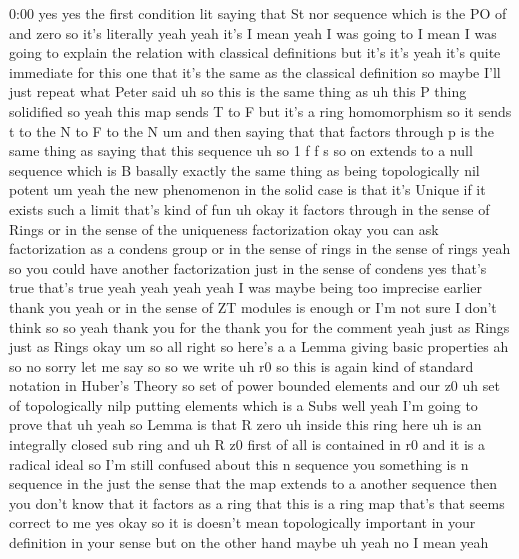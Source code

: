 \begin{unfinished}{0:00}
yes  yes  the  first  condition  lit  saying
that  St  nor  sequence  which  is  the  PO  of
and  zero  so  it's  literally  yeah  yeah
it's  I  mean  yeah  I  was  going  to  I  mean  I
was  going  to  explain  the  relation  with
classical  definitions  but  it's  it's  yeah
it's  quite  immediate  for  this  one  that
it's  the  same  as  the  classical
definition  so  maybe  I'll  just  repeat
what  Peter  said  uh  so  this  is  the  same
thing  as  uh  this  P  thing
solidified  so  yeah  this  map  sends  T  to  F
but  it's  a  ring  homomorphism  so  it  sends
t  to  the  N  to  F  to  the  N  um  and  then
saying  that  that  factors  through  p  is
the  same  thing  as  saying  that  this
sequence  uh  so  1  f  f  s  so  on  extends  to
a  null  sequence  which  is  B  basally
exactly  the  same  thing  as  being
topologically  nil
potent
um  yeah  the  new  phenomenon  in  the  solid
case  is  that  it's  Unique  if  it  exists
such  a  limit  that's  kind  of
fun  uh
okay  it  factors  through  in  the  sense  of
Rings  or  in  the  sense  of  the
uniqueness  factorization  okay  you  can
ask  factorization  as  a  condens  group  or
in  the  sense  of  rings  in  the  sense  of
rings  yeah  so  you  could  have  another
factorization  just  in  the  sense  of
condens  yes  that's  true  that's  true  yeah
yeah  yeah  yeah  I  was  maybe  being  too
imprecise  earlier  thank  you  yeah  or  in
the  sense  of  ZT  modules  is  enough  or  I'm
not  sure  I  don't  think  so  so  yeah  thank
you  for  the  thank  you  for  the  comment
yeah  just  as  Rings  just  as
Rings  okay  um  so
all  right  so  here's  a  a  Lemma  giving
basic  properties  ah  so  no  sorry  let  me
say
so  so  we  write  uh
r0  so  this  is  again  kind  of  standard
notation  in  Huber's  Theory  so  set  of
power  bounded
elements  and  our
z0  uh  set  of  topologically  nilp  putting
elements
which  is  a  Subs  well  yeah  I'm  going  to
prove  that  uh  yeah  so  Lemma  is  that  R
zero  uh  inside  this  ring  here  uh  is  an
integrally
closed  sub
ring  and  uh  R  z0  first  of  all  is
contained  in  r0  and  it  is  a  radical
ideal
so  I'm  still  confused  about  this  n
sequence  you  something  is  n  sequence  in
the  just  the  sense  that  the  map  extends
to  a  another  sequence  then  you  don't
know  that  it  factors  as  a  ring  that  this
is  a  ring  map  that's  that  seems  correct
to  me  yes  okay  so  it  is  doesn't  mean
topologically  important  in  your
definition  in  your  sense  but  on  the
other  hand  maybe  uh  yeah  no  I  mean  yeah

\end{unfinished}
